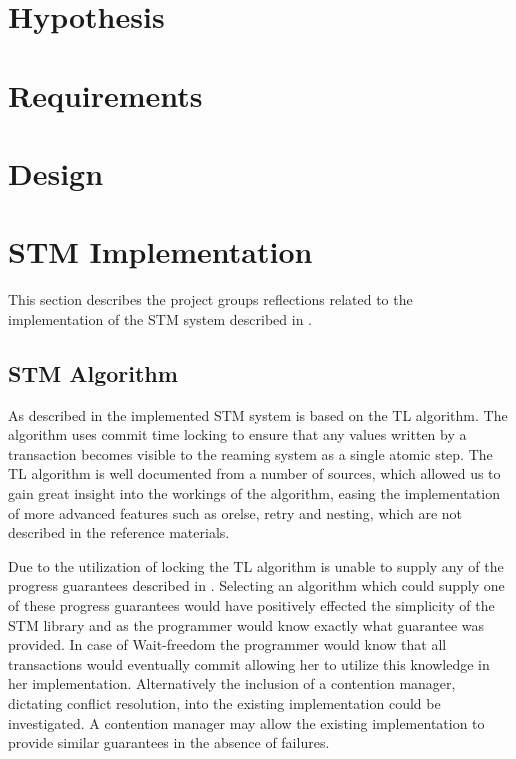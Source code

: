 \section{Hypothesis}
\section{Requirements}
\section{Design}
\section{STM Implementation}
This section describes the project groups reflections related to the implementation of the \ac{STM} system described in .

\subsection{STM Algorithm}
As described in  the implemented \ac{STM} system is based on the TL algorithm\cite{dice2006transactional}. The algorithm uses commit time locking to ensure that any values written by a transaction becomes visible to the reaming system as a single atomic step. The TL algorithm is well documented from a number of sources\cite{dice2006transactional}\cite[p. 438]{herlihy2012art}\cite[p. 106]{harris2010transactional}, which allowed us to gain great insight into the workings of the algorithm, easing the implementation of more advanced features such as orelse, retry and nesting, which are not described in the reference materials.

Due to the utilization of locking the TL algorithm is unable to supply any of the progress guarantees described in . Selecting an algorithm which could supply one of these progress guarantees would have positively effected the simplicity of the \ac{STM} library and \stmname as the programmer would know exactly what guarantee was provided. In case of Wait-freedom the programmer would know that all transactions would eventually commit allowing her to utilize this knowledge in her implementation. Alternatively the inclusion of a contention manager, dictating conflict resolution, into the existing implementation could be investigated. A contention manager may allow the existing implementation to provide similar guarantees in the absence of failures.
